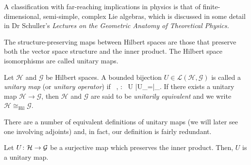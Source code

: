 A classification with far-reaching implications in physics is that of finite-dimensional, semi-simple, complex Lie algebras, which is discussed in some detail in Dr Schuller's \textit{Lectures on the Geometric Anatomy of Theoretical Physics.}


The structure-preserving maps between Hilbert spaces are those that preserve both the vector space structure and the inner product. The Hilbert space isomorphisms are called unitary maps.


\bd
Let $\mathcal{H}$ and $\mathcal{G}$ be Hilbert spaces. A bounded bijection $U\in\mathcal{L}(\mathcal{H},\mathcal{G})$ is called a \emph{unitary map} (or \emph{unitary operator}) if
\bse
\forall \, \psi,\varphi\in{} : \
\langle U \psi|U\varphi \rangle_{}=\langle \psi|\varphi \rangle_{}.
\ese
If there exists a unitary map $\mathcal{H}\to\mathcal{G}$, then $\mathcal{H}$ and $\mathcal{G}$ are said to be \emph{unitarily equivalent} and we write $\mathcal{H}\cong_{\mathrm{Hil}}\mathcal{G}$.
\ed

There are a number of equivalent definitions of unitary maps (we will later see one involving adjoints) and, in fact, our definition is fairly redundant. 

\bp
Let $U\colon\mathcal{H}\to\mathcal{G}$ be a surjective map which preserves the inner product. Then, $U$ is a unitary map.  
\ep

